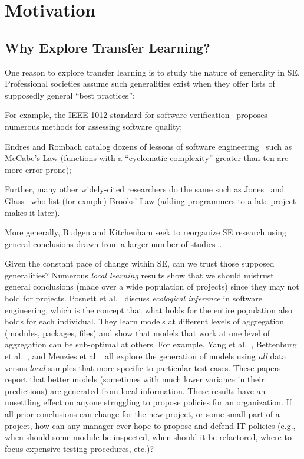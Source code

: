 \section{Motivation}
\label{sec:Motivation}

\subsection{Why Explore Transfer Learning?}
One reason to explore transfer learning
is to study the nature of
generality in SE. Professional
societies assume such generalities exist when they
offer lists of supposedly general ``best practices'':
\squishlist
\item For example, the  IEEE 1012 standard for software
  verification~\cite{1012} proposes numerous methods for assessing software quality;
\item
 Endres and Rombach catalog
dozens of lessons of software
engineering~\cite{endres03} such as McCabe's Law (functions with a ``cyclomatic complexity'' greater
than ten are more error prone);
\item Further, many other
widely-cited researchers do the same such as Jones~\cite{jones10} and
Glass~\cite{glass02} who list (for exmple)
Brooks' Law (adding programmers to a late project makes it later).
\item
  More generally, Budgen and Kitchenham seek to
reorganize SE research using general conclusions
drawn from a larger number of
studies~\cite{budgen06,budgen09}.
\squishend 

Given the constant pace of change within SE, can we trust
those supposed generalities? 
Numerous {\em local learning} results show that we
should mistrust general conclusions (made over a
wide population of projects) since they may not hold
for projects. Posnett et al.~\cite{posnett11}
discuss {\em ecological inference} in software
engineering, which is the concept that what holds
for the entire population also holds for each
individual. They learn models at different levels
of aggregation (modules, packages, files) and show
that models that work at one level of aggregation
can be sub-optimal at others.  For example, Yang et
al.~\cite{yang11}, Bettenburg et
al.~\cite{betten14}, and Menzies et al.~\cite{me12d}
all explore the generation of models using {\em all}
data versus {\em local} samples that more specific
to particular test cases. These papers report that
better models (sometimes with much lower variance in
their predictions) are generated from local
information.
These results have an unsettling effect on anyone
struggling to propose policies for an organization.
If all prior conclusions can change for the new
project, or some small part of a project, how can
any manager ever hope to propose and defend IT
policies (e.g., when should some module be inspected,
when should it be refactored, where to focus
expensive testing procedures, etc.)?

